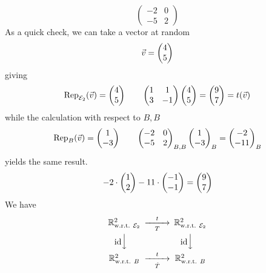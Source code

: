 \begin{exercises}
\begin{answer}
\begin{exparts}
\begin{equation*}
\begin{pmatrix}
              -2  &0   \\
              -5  &2 
            \end{pmatrix}
          \end{equation*}
          As a quick check, we can take a vector at random
          \begin{equation*}
            \vec{v}=\colvec{4  \\  5}
          \end{equation*}
          giving
          \begin{equation*}
            \rep{\vec{v}}{\stdbasis_2}=\colvec{4 \\ 5}
            \qquad
            \begin{pmatrix}
              1  &1  \\
              3  &-1   
            \end{pmatrix}
            \colvec{4 \\ 5}
            =\colvec{9 \\ 7}=t(\vec{v})
          \end{equation*}
          while the calculation with respect to $B,B$ 
          \begin{equation*}
            \rep{\vec{v}}{B}=\colvec{1 \\ -3}
            \qquad
            \begin{pmatrix}
              -2  &0   \\
              -5  &2 
            \end{pmatrix}_{B,B}
            \colvec{1 \\ -3}_B
            =\colvec{-2 \\ -11}_B
          \end{equation*}
          yields the same result.
          \begin{equation*}
            -2\cdot\colvec{1 \\ 2}-11\cdot\colvec{-1 \\ -1}=\colvec{9 \\ 7}
          \end{equation*}
       \partsitem We have
          \begin{equation*}
            \begin{CD}
              \Re^2_\wrt{\stdbasis_2}         @>t>T>     \Re^2_\wrt{\stdbasis_2}       \\
              @V\scriptstyle\identity VV         @V\scriptstyle\identity VV \\
              \Re^2_\wrt{B}        @>t>\hat{T}>  \Re^2_\wrt{B}

\end{CD}
\end{equation*}
\end{exparts}
\end{answer}
\end{exercises}
